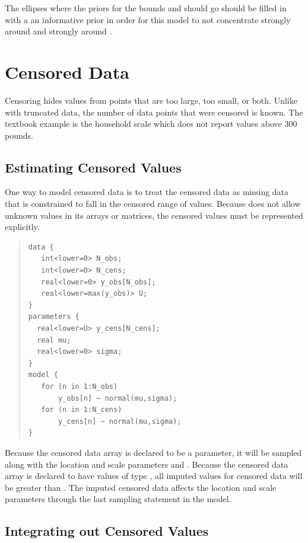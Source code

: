 The ellipses where the priors for the bounds  and 
should go should be filled in with a an informative prior in
order for this model to not concentrate  strongly around 
 and  strongly around .


\section{Censored Data}

Censoring hides values from points that are too large, too small, or
both.  Unlike with truncated data, the number of data points that were
censored is known.  The textbook example is the household scale which
does not report values above 300 pounds.  

\subsection{Estimating Censored Values}

One way to model censored data is to treat the censored data as
missing data that is constrained to fall in the censored range of
values.  Because \Stan does not allow unknown values in its arrays or
matrices, the censored values must be represented explicitly.
%
\begin{quote}
\begin{Verbatim}
data {
   int<lower=0> N_obs;
   int<lower=0> N_cens;
   real<lower=0> y_obs[N_obs];
   real<lower=max(y_obs)> U;
}
parameters {
  real<lower=U> y_cens[N_cens];
  real mu;
  real<lower=0> sigma;
}
model {
   for (n in 1:N_obs)
       y_obs[n] ~ normal(mu,sigma);
   for (n in 1:N_cens)
       y_cens[n] ~ normal(mu,sigma);
}
\end{Verbatim}
\end{quote}
%
Because the censored data array  is declared to be a parameter, it
will be sampled along with the location and scale parameters 
and .  Because the censored data array  is
declared to have values of type , all imputed values
for censored data will be greater than .  The imputed censored
data affects the location and scale parameters through the last
sampling statement in the model.  

\subsection{Integrating out Censored Values}

